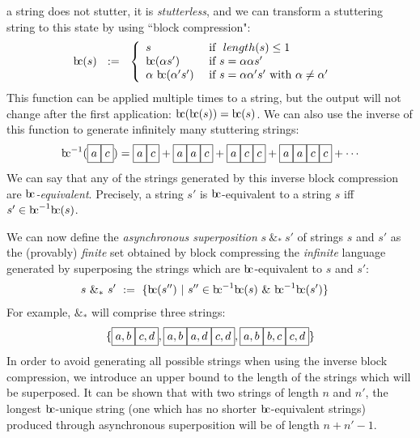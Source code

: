 \documentclass[a4paper,11pt]{article}
\newcommand{\bc}{{\rm b\!c}}
\newcommand{\vph}[1]{\vphantom{#1}}
\newcommand{\ebox}[1]{\fbox{$\vph{',}#1$}}
\begin{document}
a string does not 
stutter, it is \textit{stutterless}, and we can transform a stuttering string 
to this 
state by using ``block compression":
\begin{align*}
\bc(s)  &\ \ :=\ \
\left\{ \begin{array}{ll}
s & \mbox{ if }~length(s)\leq 1 \\
\bc({\alpha}s')  & \mbox{ if } s={\alpha}{\alpha}s'\\
\alpha ~{\bc}({\alpha'}{s'})  
& \mbox{ if } s=\alpha{\alpha'}{s'} \mbox{ with } \alpha\neq\alpha'
\end{array}
\right. 
\end{align*}
This function can be applied multiple times to a string, but the output will 
not change after the first application: $\bc(\bc(s)) = \bc(s)$. We can also use 
the inverse of this function to generate infinitely many stuttering strings:
\begin{align*}
\bc^{-1}(\ebox{a}\ebox{c}) = 
\ebox{a}\ebox{c} + 
\ebox{a}\ebox{a}\ebox{c} + 
\ebox{a}\ebox{c}\ebox{c} + 
\ebox{a}\ebox{a}\ebox{c}\ebox{c} + 
\cdots
\end{align*}
We can say that any of the strings generated by this inverse block compression 
are \textit{$\bc{}$-equivalent}. Precisely, a string $s'$ is $\bc{}$-equivalent 
to a 
string 
$s$ iff $s' \in \bc^{-1}\bc(s)$.

We can now define the \textit{asynchronous superposition} $s~\&_*~s'$ of 
strings $s$ and 
$s'$ as the (provably) \textit{finite} set obtained by block compressing the 
\textit{infinite} 
language generated by superposing the strings which are $\bc$-equivalent to $s$ 
and $s'$:
\begin{align*}
s\ \&_* \ s' & \ := \
\{\bc(s'') \ | \ s''\in \bc^{-1}\bc(s)\ \& \ \bc^{-1}\bc(s')\}
\end{align*}
For example, \ebox{a}\ebox{c} $\&_*$ 
\ebox{b}\ebox{d} will comprise 
three strings:
\begin{align*}
\{ \ebox{a, b}\ebox{c, d},
\ebox{a, b}\ebox{a, d}\ebox{c, d},
\ebox{a, b}\ebox{b, c}\ebox{c, d} \}
\end{align*}
In order to avoid generating all possible strings when using the inverse block 
compression, we introduce an upper bound to the length of the strings which 
will be superposed. It can be shown that with two strings of length $n$ and 
$n'$, the longest $\bc$-unique string (one which has no shorter 
$\bc$-equivalent strings) produced through asynchronous superposition will be 
of length $n+n'-1$.
\end{document}
